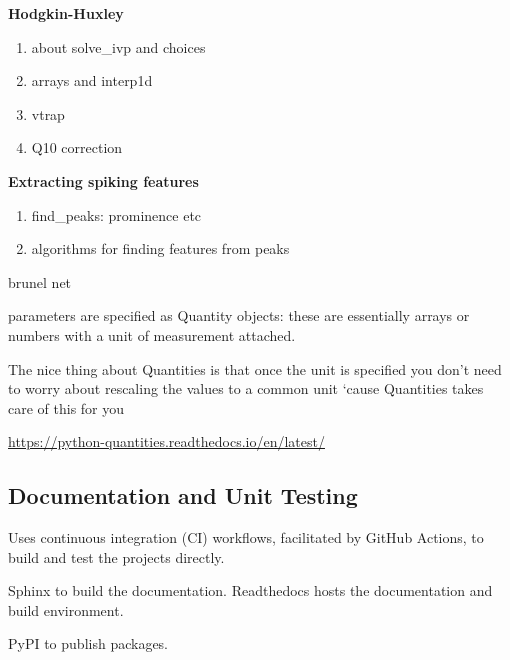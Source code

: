 \textbf{Hodgkin-Huxley}

\begin{enumerate}
    \item about solve\_ivp and choices 
    \item arrays and interp1d
    \item vtrap 
    \item Q10 correction
\end{enumerate}

\textbf{Extracting spiking features}

\begin{enumerate}
    \item find\_peaks: prominence etc 
    \item algorithms for finding features from peaks 
\end{enumerate} 

brunel net

parameters are specified as Quantity objects: these are essentially arrays or numbers with a unit of measurement attached.

The nice thing about Quantities is that once the unit is specified you don’t need to worry about rescaling the values to a common unit ‘cause Quantities takes care of this for you

\url{https://python-quantities.readthedocs.io/en/latest/}

\subsection{Documentation and Unit Testing}

Uses continuous integration (CI) workflows, facilitated by GitHub Actions, to build and test the projects directly.

Sphinx to build the documentation. Readthedocs hosts the documentation and build environment. 

PyPI to publish packages. 

